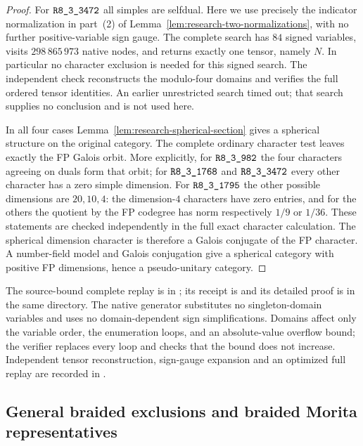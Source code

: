 \begin{proof}
For $\sha{R8_3_3472}$ all simples are selfdual.  Here we use precisely
the indicator normalization in part~(2) of
Lemma~\ref{lem:research-two-normalizations}, with no further
positive-variable sign gauge.  The complete search has $84$ signed
variables, visits $298\,865\,973$ native nodes, and returns exactly
one tensor, namely $N$.  In particular no character exclusion is
needed for this signed search.  The independent check reconstructs
the modulo-four domains and verifies the full ordered tensor identities.
An earlier unrestricted search timed out; that search supplies no
conclusion and is not used here.

In all four cases Lemma~\ref{lem:research-spherical-section} gives a
spherical structure on the original category.  The complete ordinary
character test leaves exactly the FP Galois orbit.  More explicitly,
for $\sha{R8_3_982}$ the four characters agreeing on duals form that
orbit; for $\sha{R8_3_1768}$ and $\sha{R8_3_3472}$ every other
character has a zero simple dimension.  For $\sha{R8_3_1795}$ the
other possible dimensions are $20,10,4$: the dimension-$4$ characters
have zero entries, and for the others the quotient by the FP codegree
has norm respectively $1/9$ or $1/36$.  These statements are checked
independently in the full exact character calculation.
The spherical dimension character is therefore a Galois conjugate
of the FP character.  A number-field model and Galois conjugation
\cite[Theorem~2.30 and the following remark]{ENO} give a spherical
category with positive FP dimensions, hence a pseudo-unitary category.
\end{proof}

The source-bound complete replay is
 in
;
its receipt is  and its detailed
proof is  in the same directory.
The native generator substitutes no singleton-domain variables and
uses no domain-dependent sign simplifications.  Domains affect only
the variable order, the enumeration loops, and an absolute-value
overflow bound; the verifier replaces every loop and checks that
the bound does not increase.  Independent tensor reconstruction,
sign-gauge expansion and an optimized full replay are recorded in
.

\subsection{General braided exclusions and braided Morita representatives}
\label{subsec:research-braided-morita}


